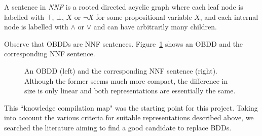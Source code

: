 \documentclass[11pt]{report}
\newenvironment{definition}[1][Definition]{\begin{trivlist}
\item[\hskip \labelsep {\bfseries #1}]}{\end{trivlist}}
\begin{document}
\begin{definition}
A sentence in \textit{NNF} is a rooted directed acyclic graph where each leaf node is labelled with $\top$, $\bot$, $X$ or $\lnot X$ for some propositional variable $X$, and each internal node is labelled with $\land$ or $\lor$ and can have arbitrarily many children. 

\end{definition} 

\noindent Observe that OBDDs are NNF sentences. Figure~\ref{nnf_obdd} shows an OBDD and the corresponding NNF sentence.  

\begin{figure}
\centering
{}
\qquad\quad 
{}

	\caption{An OBDD (left) and the corresponding NNF sentence (right). Although the former seems much more compact, the difference in size is only linear and both representations are essentially the same.}
\label{nnf_obdd}

\end{figure}
 
 This ``knowledge compilation map" was the starting point for this project. Taking into account the various criteria for suitable representations described above, we searched the literature aiming to find a good candidate to replace BDDs. 
\end{document}
